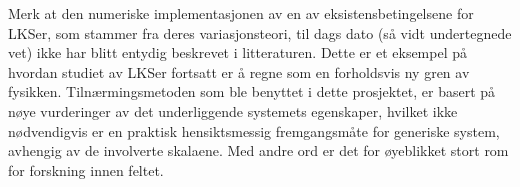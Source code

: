 Merk at den numeriske implementasjonen av en av eksistensbetingelsene for
LKSer, som stammer fra deres variasjonsteori, til dags dato (så vidt
undertegnede vet) ikke har blitt entydig beskrevet i litteraturen. Dette er
et eksempel på hvordan studiet av LKSer fortsatt er å regne som en
forholdsvis ny gren av fysikken. Tilnærmingsmetoden som ble benyttet i
dette prosjektet, er basert på nøye vurderinger av det underliggende systemets
egenskaper, hvilket ikke nødvendigvis er en praktisk hensiktsmessig
fremgangsmåte for generiske system, avhengig av de involverte skalaene. Med
andre ord er det for øyeblikket stort rom for forskning innen feltet.
